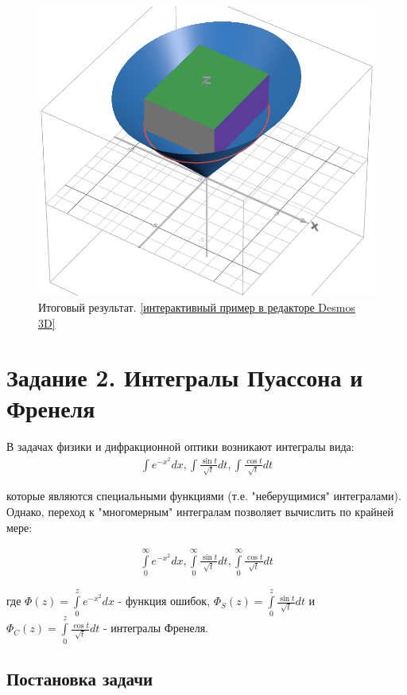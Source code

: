 \documentclass{article}
\begin{document}
\begin{figure}[H]
    \begin{center}
        \includegraphics[width=.5\textwidth]{res.png}
    \end{center}
\caption{Итоговый результат. \href{https://www.desmos.com/3d/88d50f8402}{[интерактивный пример в редакторе Desmos 3D]}}
\end{figure}
\newpage
\section*{Задание 2. Интегралы Пуассона и Френеля}
В задачах физики и дифракционной оптики возникают интегралы вида:
\begin{equation*}
\begin{aligned}
\int\limits e^{-x^2}dx, \int\limits \frac{\sin{t}}{\sqrt{t}} dt, \int\limits \frac{\cos{t}}{\sqrt{t}} dt
\end{aligned}
\end{equation*}

которые являются специальными функциями (т.е. "неберущимися" интегралами). Однако, переход
к "многомерным" интегралам позволяет вычислить по крайней мере:

\begin{equation*}
\begin{aligned}
\int\limits_0^{\infty} e^{-x^2}dx, \int\limits_0^{\infty} \frac{\sin{t}}{\sqrt{t}} dt, \int\limits_0^{\infty} \frac{\cos{t}}{\sqrt{t}} dt
\end{aligned}
\end{equation*}

где $\Phi(z) = \int\limits_0^{z} e^{-x^2}dx$ - функция ошибок, $\Phi_{S}(z) = \int\limits_0^{z} \frac{\sin{t}}{\sqrt{t}} dt$ и $\Phi_{C}(z) = \int\limits_0^{z} \frac{\cos{t}}{\sqrt{t}} dt$ - интегралы Френеля.

\subsection*{Постановка задачи}
\end{document}
